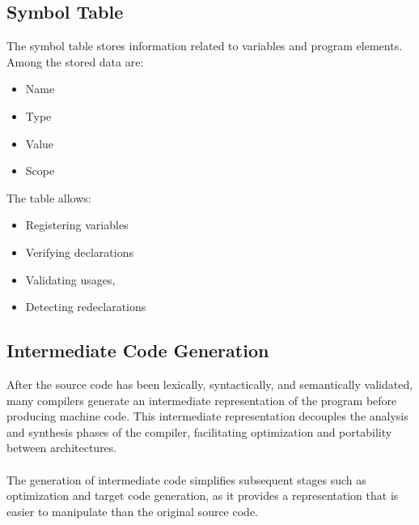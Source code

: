 \documentclass[letterpaper,12pt,oneside]{article}
\begin{document}
    \subsection{Symbol Table}
    The symbol table stores information related to variables and program elements. \\
    Among the stored data are:
    \begin{itemize}
        \item Name 
        \item Type
        \item Value
        \item Scope
    \end{itemize}
    The table allows:
    \begin{itemize}
        \item Registering variables 
        \item Verifying declarations
        \item Validating usages,
        \item Detecting redeclarations
    \end{itemize}

    \subsection{Intermediate Code Generation}
    After the source code has been lexically, syntactically, and semantically validated, many compilers generate an intermediate representation of the program before producing machine code. This intermediate representation decouples the analysis and synthesis phases of the compiler, facilitating optimization and portability between architectures. \\ \\
    The generation of intermediate code simplifies subsequent stages such as optimization and target code generation, as it provides a representation that is easier to manipulate than the original source code.
\end{document}
